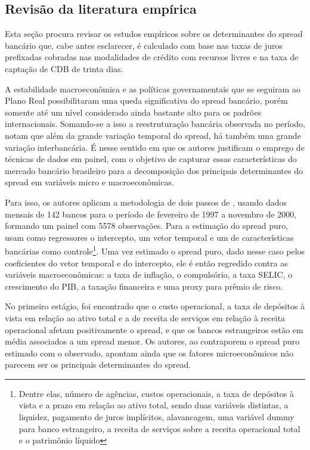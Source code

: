 \documentclass[a4paper,
               article,
               12pt,
               openany,
               oneside,
               english,
               brazil]{abntex2}
\numberwithin{equation}{section}
\begin{document}
\subsection{Revisão da literatura empírica}

    Esta seção procura revisar os estudos empíricos sobre os determinantes do spread bancário que, cabe antes esclarecer, é calculado com base nas taxas de juros prefixadas cobradas nas modalidades de crédito com recursos livres e na taxa de captação de CDB de trinta dias.

    A estabilidade macroeconômica e as políticas governamentais que se seguiram ao Plano Real possibilitaram uma queda significativa do spread bancário, porém somente até um nível considerado ainda bastante alto para os padrões internacionais. Somando-se a isso a reestruturação bancária observada no período, \textcite{afanasieff02} notam que além da grande variação temporal do spread, há também uma grande variação interbancária. É nesse sentido em que os autores justificam o emprego de técnicas de dados em painel, com o objetivo de capturar essas características do mercado bancário brasileiro para a decomposição dos principais determinantes do spread em variáveis micro e macroeconômicas.

    Para isso, os autores aplicam a metodologia de dois passos de \textcite{hoesaunders}, usando dados mensais de 142 bancos para o período de fevereiro de 1997 a novembro de 2000, formando um painel com 5578 observações. Para a estimação do spread puro, usam como regressores o intercepto, um vetor temporal e um de características bancárias como controle\footnote{Dentre elas, número de agências, custos operacionais, a taxa de depósitos à vista e a prazo em relação ao ativo total, sendo duas variáveis distintas, a liquidez, pagamento de juros implícitos, alavancagem, uma variável dummy para banco estrangeiro, a receita de serviços sobre a receita operacional total e o patrimônio líquido}. Uma vez estimado o spread puro, dado nesse caso pelos coeficientes do vetor temporal e do intercepto, ele é então regredido contra as variáveis macroeconômicas: a taxa de inflação, o compulsório, a taxa SELIC, o crescimento do PIB, a taxação financeira e uma proxy para prêmio de risco.

    No primeiro estágio, foi encontrado que o custo operacional, a taxa de depósitos à vista em relação ao ativo total e a de receita de serviços em relação à receita operacional afetam positivamente o spread, e que os bancos estrangeiros estão em média associados a um spread menor. Os autores, ao contraporem o spread puro estimado com o observado, apontam ainda que os fatores microeconômicos não parecem ser os principais determinantes do spread.
    
\end{document}
